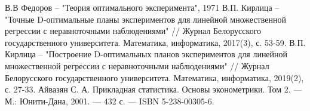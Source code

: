 \begin{thebibliography}{}
	 В.В Федоров -- "Теория оптимального эксперимента", 1971
	 В.П. Кирлица -- "Точные  D-оптимальные планы экспериментов для линейной множественной регрессии с неравноточными наблюдениями" // Журнал Белорусского государственного университета. Математика, информатика, 2017(3), с. 53-59.
	 В.П. Кирлица -- "Построение  D-оптимальных  планов экспериментов для линейной множественной регрессии с неравноточными наблюдениями" // Журнал Белорусского государственного университета. Математика, информатика, 2019(2), с. 27-33.
	 Айвазян С. А. Прикладная статистика. Основы эконометрики. Том 2. — М.: Юнити-Дана, 2001. — 432 с. — ISBN 5-238-00305-6.
\end{thebibliography}

